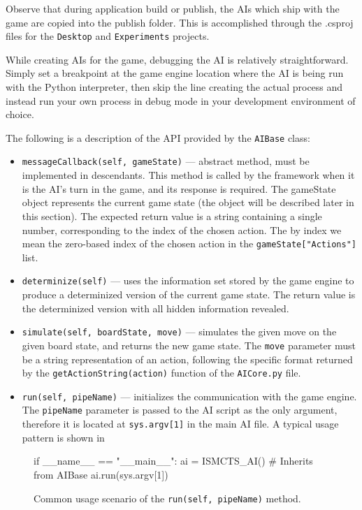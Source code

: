 Observe that during application build or publish, the AIs which ship with
the game are copied into the publish folder. This is accomplished through
the .csproj files for the \texttt{Desktop} and \texttt{Experiments} projects.

While creating AIs for the game, debugging the AI is relatively straightforward.
Simply set a breakpoint at the game engine location where the AI is being
run with the Python interpreter, then skip the line creating the actual process
and instead run your own process in debug mode in your development environment
of choice.

The following is a description of the API provided by the \texttt{AIBase}
class:
\begin{itemize}
    \item \texttt{messageCallback(self, gameState)} --- abstract method, must be implemented
        in descendants. This method is called by the framework when it is the AI's
        turn in the game, and its response is required. The gameState object represents
        the current game state (the object will be described later in this section).
        The expected return value is a string containing a single number,
        corresponding to the index of the chosen action. The by index we mean the zero-based
        index of the chosen action in the \texttt{gameState["Actions"]} list.
    \item \texttt{determinize(self)} --- uses the information set stored by the game
        engine to produce a determinized version of the current game state.
        The return value is the determinized version with all hidden information
        revealed.
    \item \texttt{simulate(self, boardState, move)} --- simulates the given move
        on the given board state, and returns the new game state. The \texttt{move}
        parameter must be a string representation of an action, following the specific
        format returned by the \texttt{getActionString(action)} function
        of the \texttt{AICore.py} file.
    \item \texttt{run(self, pipeName)} --- initializes the communication
        with the game engine. The \texttt{pipeName} parameter is passed to the AI
        script as the only argument, therefore it is located at \texttt{sys.argv[1]}
        in the main AI file. A typical usage pattern is shown in 
\end{itemize}

\begin{figure}[ht]
\begin{code}[commandchars=\\\{\},codes={\catcode`\$=3\catcode`\^=7\catcode`\_=8}]
if \_\_name\_\_ == "\_\_main\_\_":
    ai = ISMCTS\_AI() \# Inherits from AIBase
    ai.run(sys.argv[1])
\end{code}
\caption{Common usage scenario of the \texttt{run(self, pipeName)} method.}
\label{dd:airun}
\end{figure}

